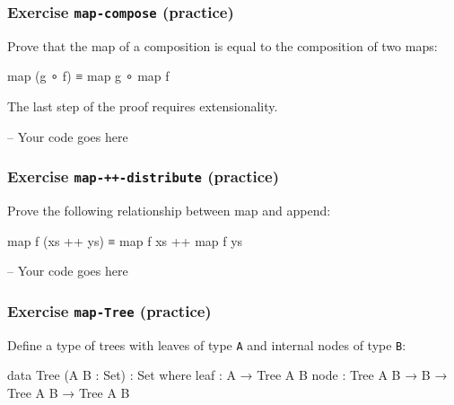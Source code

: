 \hypertarget{exercise-map-compose-practice}{%
\subsubsection{\texorpdfstring{Exercise \texttt{map-compose}
(practice)}{Exercise map-compose (practice)}}\label{exercise-map-compose-practice}}

Prove that the map of a composition is equal to the composition of two
maps:

\begin{myDisplay}
map (g ∘ f) ≡ map g ∘ map f
\end{myDisplay}

The last step of the proof requires extensionality.

\begin{fence}
\begin{code}
-- Your code goes here
\end{code}
\end{fence}

\hypertarget{exercise-map--distribute-practice}{%
\subsubsection{\texorpdfstring{Exercise \texttt{map-++-distribute}
(practice)}{Exercise map-++-distribute (practice)}}\label{exercise-map--distribute-practice}}

Prove the following relationship between map and append:

\begin{myDisplay}
map f (xs ++ ys) ≡ map f xs ++ map f ys
\end{myDisplay}

\begin{fence}
\begin{code}
-- Your code goes here
\end{code}
\end{fence}

\hypertarget{exercise-map-tree-practice}{%
\subsubsection{\texorpdfstring{Exercise \texttt{map-Tree}
(practice)}{Exercise map-Tree (practice)}}\label{exercise-map-tree-practice}}

Define a type of trees with leaves of type \texttt{A} and internal nodes
of type \texttt{B}:

\begin{fence}
\begin{code}
data Tree (A B : Set) : Set where
  leaf : A → Tree A B
  node : Tree A B → B → Tree A B → Tree A B
\end{code}
\end{fence}

